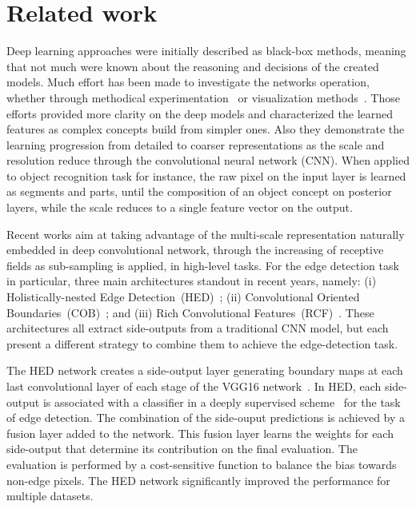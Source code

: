 \section{Related work}
\label{sec:related}

Deep learning approaches were initially described as black-box methods, meaning that not much were known about the reasoning and decisions of the created models. Much effort has been made to investigate the networks operation, whether through methodical experimentation~\cite{ilin17,kuo16,eigen14,zhang17} or visualization methods~\cite{simonyan13,zeiler14}. Those efforts provided more clarity on the deep models and characterized the learned features as complex concepts build from simpler ones. Also they demonstrate the learning progression from detailed to coarser representations as the scale and resolution reduce through the convolutional neural network (CNN).  When applied to object recognition task for instance, the raw pixel on the input layer is learned as segments and parts, until the composition of an object concept on posterior layers, while the scale reduces to a single feature vector on the output.  

Recent works aim at taking advantage of the multi-scale representation naturally embedded in deep convolutional network, through the increasing of receptive fields as sub-sampling is applied, in high-level tasks. For the edge detection task in particular, three main architectures standout in recent years, namely: (i) Holistically-nested Edge Detection~(HED)~\cite{xie2015,xie2017}; (ii) Convolutional Oriented Boundaries~(COB)~\cite{maninis2017}; and (iii) Rich Convolutional Features~(RCF)~\cite{liu2017}. These architectures all extract side-outputs from a traditional CNN model, but each present a different strategy to combine them to achieve the edge-detection task.

The HED network creates a side-output layer generating boundary maps at each last convolutional layer of each stage of the VGG16 network~\cite{simonyan2014}. In HED, each side-output is associated with a classifier in a deeply supervised scheme~\cite{lee2015} for the task of edge detection. The combination of the side-ouput predictions is achieved by a fusion layer added to the network. This fusion layer learns the weights for each side-output that determine its contribution on the final evaluation.
The evaluation is performed by a cost-sensitive function to balance the bias towards non-edge pixels. The HED network significantly improved the performance for multiple datasets.

